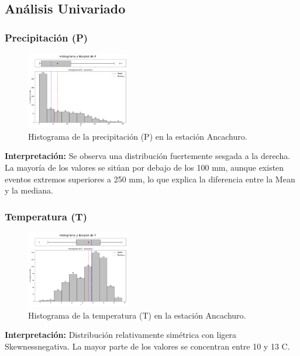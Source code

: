 \subsection{Análisis Univariado}

\subsubsection*{Precipitación (P)}
\begin{figure}[H]
\centering
\includegraphics[width=0.4\textwidth]{resultados/por_estacion_meteorologica/Ancachuro/P_histograma.png}
\caption{Histograma de la precipitación (P) en la estación Ancachuro.}
\label{fig:ancachuro_P}
\end{figure}
\textbf{Interpretación:} Se observa una distribución fuertemente sesgada a la derecha. La mayoría de los valores se sitúan por debajo de los 100 mm, aunque existen eventos extremos superiores a 250 mm, lo que explica la diferencia entre la Mean y la mediana.

\subsubsection*{Temperatura (T)}
\begin{figure}[H]
\centering
\includegraphics[width=0.4\textwidth]{resultados/por_estacion_meteorologica/Ancachuro/T_histograma.png}
\caption{Histograma de la temperatura (T) en la estación Ancachuro.}
\label{fig:ancachuro_T}
\end{figure}
\textbf{Interpretación:} Distribución relativamente simétrica con ligera Skewnessnegativa. La mayor parte de los valores se concentran entre 10 y 13 \textdegree C.


